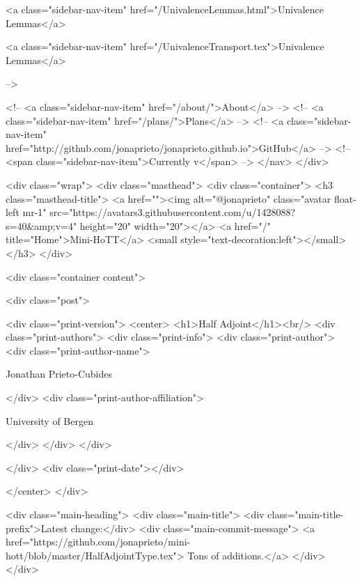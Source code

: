       
    
      
        
          <a class="sidebar-nav-item" href="/UnivalenceLemmas.html">Univalence Lemmas</a>
        
      
    
      
        
          <a class="sidebar-nav-item" href="/UnivalenceTransport.tex">Univalence Lemmas</a>
        
      
     -->

    <!-- <a class="sidebar-nav-item" href="/about/">About</a> -->
    <!-- <a class="sidebar-nav-item" href="/plans/">Plans</a> -->
    <!-- <a class="sidebar-nav-item" href="http://github.com/jonaprieto/jonaprieto.github.io">GitHub</a> -->
    <!-- <span class="sidebar-nav-item">Currently v</span> -->
  </nav>
</div>

    <div class="wrap">
      <div class="masthead">
        <div class="container">
          <h3 class="masthead-title">
            <a href=""><img alt="@jonaprieto" class="avatar float-left mr-1" src="https://avatars3.githubusercontent.com/u/1428088?s=40&amp;v=4" height="20" width="20"></a>
            <a href="/" title="Home">Mini-HoTT</a>
            <small style="text-decoration:left"></small>
          </h3>
        </div>
      
      <div class="container content">
        







<div class="post">

  <div class="print-version">
    <center>
      <h1>Half Adjoint</h1><br/>
        <div class="print-authors">
          <div class="print-info">
            <div class="print-author">
              <div class="print-author-name">
                
                  Jonathan Prieto-Cubides
                
              </div>
              <div class="print-author-affiliation">
                
                  University of Bergen
                
                </div>
            </div>
          </div>
          
          
        </div>
        <div class="print-date"></div>
        
        
    </center>
  </div>

  
  <div class="main-heading">
    <div class="main-title">
      <div class="main-title-prefix">Latest change:</div>
      <div class="main-commit-message">
            <a href="https://github.com/jonaprieto/mini-hott/blob/master/HalfAdjointType.tex">
              Tons of additions.</a>
      </div>
    </div>

